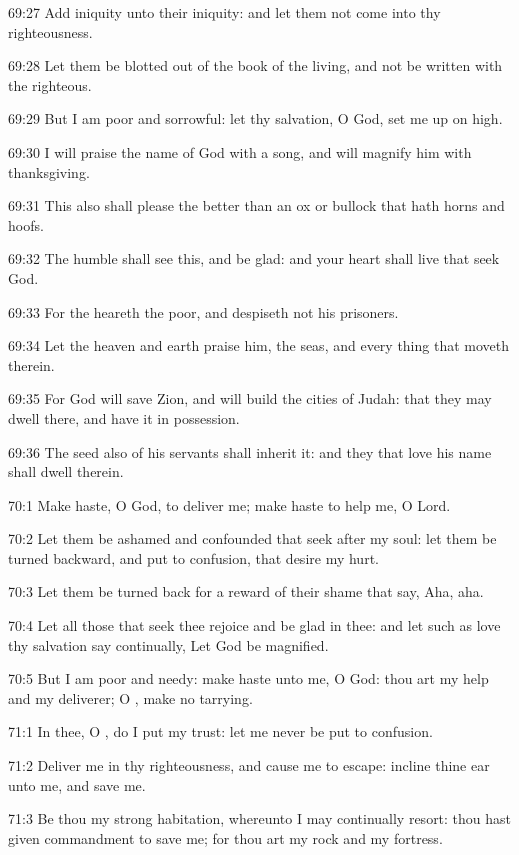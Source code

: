 69:27 Add iniquity unto their iniquity: and let them not come into thy
righteousness.

69:28 Let them be blotted out of the book of the living, and not be
written with the righteous.

69:29 But I am poor and sorrowful: let thy salvation, O God, set me up
on high.

69:30 I will praise the name of God with a song, and will magnify him
with thanksgiving.

69:31 This also shall please the \LORD better than an ox or bullock
that hath horns and hoofs.

69:32 The humble shall see this, and be glad: and your heart shall
live that seek God.

69:33 For the \LORD heareth the poor, and despiseth not his prisoners.

69:34 Let the heaven and earth praise him, the seas, and every thing
that moveth therein.

69:35 For God will save Zion, and will build the cities of Judah: that
they may dwell there, and have it in possession.

69:36 The seed also of his servants shall inherit it: and they that
love his name shall dwell therein.



70:1 Make haste, O God, to deliver me; make haste to help me, O Lord.

70:2 Let them be ashamed and confounded that seek after my soul: let
them be turned backward, and put to confusion, that desire my hurt.

70:3 Let them be turned back for a reward of their shame that say,
Aha, aha.

70:4 Let all those that seek thee rejoice and be glad in thee: and let
such as love thy salvation say continually, Let God be magnified.

70:5 But I am poor and needy: make haste unto me, O God: thou art my
help and my deliverer; O \LORD, make no tarrying.



71:1 In thee, O \LORD, do I put my trust: let me never be put to
confusion.

71:2 Deliver me in thy righteousness, and cause me to escape: incline
thine ear unto me, and save me.

71:3 Be thou my strong habitation, whereunto I may continually resort:
thou hast given commandment to save me; for thou art my rock and my
fortress.

